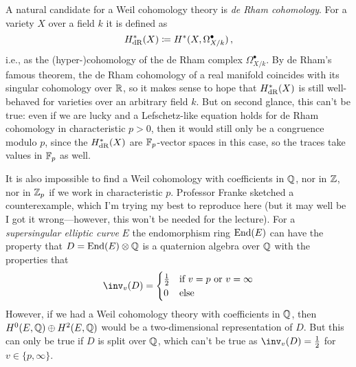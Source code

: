 \documentclass[a4paper, 10pt, oneside, DIV=9, chapterprefix=true, numbers=enddot]{scrbook}
\begin{document}
	A natural candidate for a Weil cohomology theory is \emph{de Rham cohomology}. For a variety $X$ over a field $k$ it is defined as 
	\begin{equation*}
		H_{\mathrm{dR}}^*(X)\coloneqq H^*(X,\Omega_{X/k}^\bullet)\,,
	\end{equation*}
	i.e., as the (hyper-)cohomology of the de Rham complex $\Omega_{X/k}^\bullet$.	By de Rham's famous theorem, the de Rham cohomology of a real manifold coincides with its singular cohomology over $\mathbb{R}$, so it makes sense to hope that $H_{\mathrm{dR}}^*(X)$ is still well-behaved for varieties over an arbitrary field $k$. But on second glance, this can't be true: even if we are lucky and a Lefschetz-like equation holds for de Rham cohomology in characteristic $p >0$, then it would still only be a congruence modulo $p$, since the $H_{\mathrm{dR}}^*(X)$ are $\mathbb{F}_p$-vector spaces in this case, so the traces take values in $\mathbb{F}_p$ as well.
	
	It is also impossible to find a Weil cohomology with coefficients in $\mathbb{Q}$, nor in $\mathbb{Z}$, nor in $\mathbb{Z}_p$ if we work in characteristic $p$. Professor Franke sketched a counterexample, which I'm trying my best to reproduce here (but it may well be I got it wrong---however, this won't be needed for the lecture). For a \emph{supersingular elliptic curve} $E$ the endomorphism ring $\operatorname{End}(E)$ can have the property that $D=\operatorname{End}(E)\otimes \mathbb{Q}$ is a quaternion algebra over $\mathbb{Q}$ with the properties that
	\begin{align*}
		\inv_v(D)=\begin{cases}
			\frac{1}{2} & \text{if }v=p\text{ or }v=\infty\\
			0 & \text{else}
		\end{cases}
	\end{align*}
	However, if we had a Weil cohomology theory with coefficients in $\mathbb{Q}$, then $H^0(E,\mathbb{Q})\oplus H^2(E,\mathbb{Q})$ would be a two-dimensional representation of $D$. But this can only be true if $D$ is split over $\mathbb{Q}$, which can't be true as $\inv_v(D)=\frac12$ for $v\in\{p,\infty\}$.
	
\end{document}
